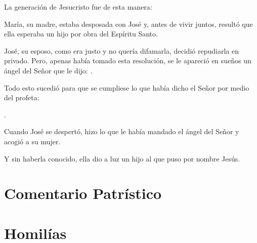 
 


\begin{scripture}
	La generación de Jesucristo fue de esta manera:
	
	María, su madre, estaba desposada con José y, antes de vivir juntos, resultó que ella esperaba un hijo por obra del Espíritu Santo.
	
	José, su esposo, como era justo y no quería difamarla, decidió repudiarla en privado. Pero, apenas había tomado esta resolución, se le apareció en sueños un ángel del Señor que le dijo: .
	
	Todo esto sucedió para que se cumpliese lo que había dicho el Señor por medio del profeta:
	
	.
	
	Cuando José se despertó, hizo lo que le había mandado el ángel del Señor y acogió a su mujer.
	
	Y sin haberla conocido, ella dio a luz un hijo al que puso por nombre Jesús.
\end{scripture}

\newsection

\section{Comentario Patrístico}




\newsection

\section{Homilías}

\homiliasNavidad



\newsection			

